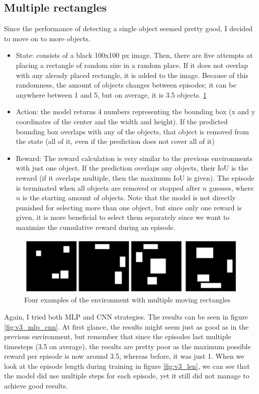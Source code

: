 \documentclass[
  digital,     %
  oneside,     %
  nosansbold,  %
  nocolorbold, %
  lof,         %
  lot,         %
]{fithesis4}
\begin{document}
\subsection{Multiple rectangles}
Since the performance of detecting a single object seemed pretty good, I decided to move on to more objects.
\begin{itemize}
    \item State: consists of a black 100x100 px image. Then, there are five attempts at placing a rectangle of random size in a random place. If it does not overlap with any already placed rectangle, it is added to the image. Because of this randomness, the amount of objects changes between episodes; it can be anywhere between 1 and 5, but on average, it is 3.5 objects. \ref{fig:env3}
    \item Action: the model returns 4 numbers representing the bounding box (x and y coordinates of the center and the width and height). If the predicted bounding box overlaps with any of the objects, that object is removed from the state (all of it, even if the prediction does not cover all of it)
    \item Reward: The reward calculation is very similar to the previous environments with just one object. If the prediction overlaps any objects, their IoU is the reward (if it overlaps multiple, then the maximum IoU is given). The episode is terminated when all objects are removed or stopped after $n$ guesses, where $n$ is the starting amount of objects. Note that the model is not directly punished for selecting more than one object, but since only one reward is given, it is more beneficial to select them separately since we want to maximize the cumulative reward during an episode.
\end{itemize}

\begin{figure}
    \includegraphics[width=1\linewidth]{env_examples/env3.png}
    \caption{Four examples of the environment with multiple moving rectangles}
    \label{fig:env3}
\end{figure}

Again, I tried both MLP and CNN strategies. The results can be seen in figure \ref{fig:v3_mlp_cnn}. At first glance, the results might seem just as good as in the previous environment, but remember that since the episodes last multiple timesteps (3.5 on average), the results are pretty poor as the maximum possible reward per episode is now around 3.5, whereas before, it was just 1. When we look at the episode length during training in figure \ref{fig:v3_len}, we can see that the model did use multiple steps for each episode, yet it still did not manage to achieve good results.
\end{document}
